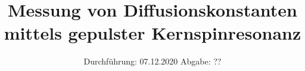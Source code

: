 

\subject{Nr. 49}
\title{Messung von Diffusionskonstanten mittels gepulster Kernspinresonanz}
\date{%
  Durchführung: 07.12.2020
  \hspace{3em}
  Abgabe: ??
}



\maketitle
\thispagestyle{empty}
\tableofcontents
\newpage






\printbibliography{}


